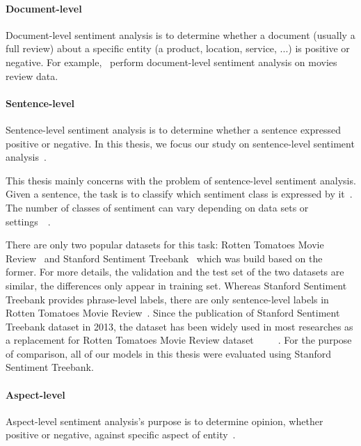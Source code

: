 \paragraph{Document-level}
Document-level sentiment analysis is to determine whether a document (usually a full review) about a specific entity (a product, location, service, ...) is positive or negative. For example,~\cite{pang2002thumbs} perform document-level sentiment analysis on movies review data.
\paragraph{Sentence-level}\label{sec:sent-level}
Sentence-level sentiment analysis is to determine whether a sentence expressed positive or negative. 
In this thesis, we focus our study on sentence-level sentiment analysis~\cite{liu2012sentiment}.

This thesis mainly concerns with the problem of sentence-level sentiment analysis. 
Given a sentence, the task is to classify which sentiment class is expressed by it~\cite{liu2012sentiment}.
The number of classes of sentiment can vary depending on data sets or settings~\cite{Rotten-Tomato}~\cite{socher2013recursive}.

There are only two popular datasets for this task: Rotten Tomatoes Movie Review~\cite{Rotten-Tomato} and Stanford Sentiment Treebank~\cite{socher2013recursive} which was build based on the former.
For more details, the validation and the test set of the two datasets are similar, the differences only appear in training set.
Whereas Stanford Sentiment Treebank provides phrase-level labels, there are only sentence-level labels in Rotten Tomatoes Movie Review~\cite{socher2013recursive}.
Since the publication of Stanford Sentiment Treebank dataset in 2013, the dataset has been widely used in most researches as a replacement for Rotten Tomatoes Movie Review dataset~\cite{treeLSTM}~\cite{KimCNN}~\cite{cnn-rnn}~\cite{2-layer-cnn}~\cite{socher2013recursive}.
For the purpose of comparison, all of our models in this thesis were evaluated using Stanford Sentiment Treebank.

\paragraph{Aspect-level}
Aspect-level  sentiment analysis's purpose is to determine opinion, whether positive or negative, against specific aspect of entity~\cite{liu2012sentiment}.




